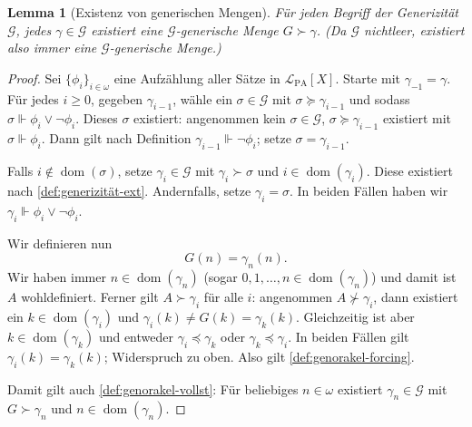 \documentclass[nofonts]{uebung}
\newtheorem{lemma}[theorem]{Lemma}
\theoremstyle{definition}
\DeclareMathOperator{\dom}{dom}
\begin{document}
\begin{lemma}[Existenz von generischen Mengen]\label{lemma:generics-existieren}
    Für jeden Begriff der Generizität $\mathcal G$, jedes $\gamma\in\mathcal G$ existiert eine $\mathcal G$-generische Menge $G\succ \gamma$.
    (Da $\mathcal G$ nichtleer, existiert also immer eine $\mathcal G$-generische Menge.)
\end{lemma}
\begin{proof}
    Sei $\{\phi_i\}_{i\in\omega}$ eine Aufzählung aller Sätze in $\mathcal L_{\mathrm{PA}}[X]$. 
    Starte mit $\gamma_{-1}=\gamma$. Für jedes $i\geq 0$, gegeben $\gamma_{i-1}$, wähle ein $\sigma\in\mathcal G$ mit $\sigma\succeq\gamma_{i-1}$ und sodass $\sigma \Vdash \phi_i\lor\neg\phi_i$. Dieses $\sigma$ existiert: angenommen kein $\sigma\in\mathcal G$, $\sigma\succeq\gamma_{i-1}$ existiert mit $\sigma\Vdash \phi_i$. Dann gilt nach Definition $\gamma_{i-1}\Vdash\neg\phi_i$; setze $\sigma=\gamma_{i-1}$.

    Falls $i\not\in\dom(\sigma)$, setze $\gamma_i\in\mathcal G$ mit $\gamma_i\succ\sigma$ und $i\in\dom(\gamma_i)$. Diese existiert nach \ref{def:generizität-ext}.
    Andernfalls, setze $\gamma_i=\sigma$.
    In beiden Fällen haben wir $\gamma_i\Vdash \phi_i\lor\neg\phi_i$.

    Wir definieren nun
    \[ G(n) = \gamma_n(n). \]
    Wir haben immer $n\in\dom(\gamma_n)$ (sogar $0,1,\dots, n\in\dom(\gamma_n)$) und damit ist $A$ wohldefiniert.
    Ferner gilt $A\succ\gamma_i$ für alle $i$: angenommen $A\not\succ\gamma_i$, dann existiert ein $k\in\dom(\gamma_i)$ und $\gamma_i(k)\neq G(k)=\gamma_k(k)$.
    Gleichzeitig ist aber $k\in\dom(\gamma_k)$ und entweder $\gamma_i\preceq \gamma_k$ oder $\gamma_k\preceq \gamma_i$. In beiden Fällen gilt $\gamma_i(k)=\gamma_k(k)$; Widerspruch zu oben.
    Also gilt \ref{def:genorakel-forcing}.

    Damit gilt auch \ref{def:genorakel-vollst}: Für beliebiges $n\in\omega$ existiert $\gamma_n\in\mathcal G$ mit $G\succ \gamma_n$ und $n\in\dom(\gamma_n)$.
\end{proof}
\end{document}
